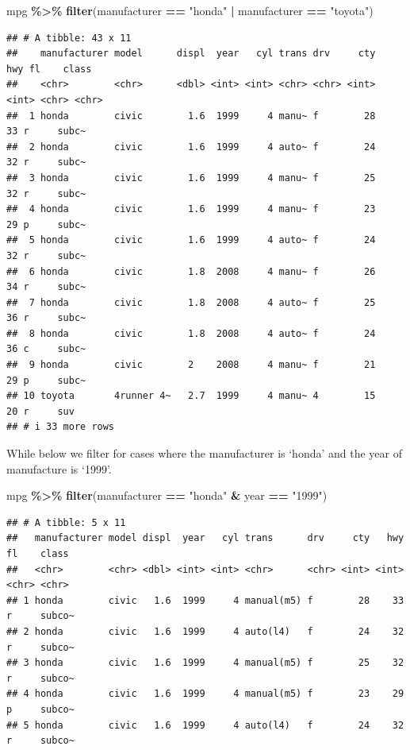 \documentclass[
]{book}
\newenvironment{Shaded}{\begin{snugshade}}{\end{snugshade}}
\newcommand{\FunctionTok}[1]{\textcolor[rgb]{0.13,0.29,0.53}{\textbf{#1}}}
\newcommand{\NormalTok}[1]{#1}
\newcommand{\SpecialCharTok}[1]{\textcolor[rgb]{0.81,0.36,0.00}{\textbf{#1}}}
\newcommand{\StringTok}[1]{\textcolor[rgb]{0.31,0.60,0.02}{#1}}
\begin{document}
\begin{Shaded}
\begin{Highlighting}[]
\NormalTok{mpg }\SpecialCharTok{\%\textgreater{}\%}
  \FunctionTok{filter}\NormalTok{(manufacturer }\SpecialCharTok{==} \StringTok{"honda"} \SpecialCharTok{|}\NormalTok{ manufacturer }\SpecialCharTok{==} \StringTok{"toyota"}\NormalTok{)}
\end{Highlighting}
\end{Shaded}

\begin{verbatim}
## # A tibble: 43 x 11
##    manufacturer model      displ  year   cyl trans drv     cty   hwy fl    class
##    <chr>        <chr>      <dbl> <int> <int> <chr> <chr> <int> <int> <chr> <chr>
##  1 honda        civic        1.6  1999     4 manu~ f        28    33 r     subc~
##  2 honda        civic        1.6  1999     4 auto~ f        24    32 r     subc~
##  3 honda        civic        1.6  1999     4 manu~ f        25    32 r     subc~
##  4 honda        civic        1.6  1999     4 manu~ f        23    29 p     subc~
##  5 honda        civic        1.6  1999     4 auto~ f        24    32 r     subc~
##  6 honda        civic        1.8  2008     4 manu~ f        26    34 r     subc~
##  7 honda        civic        1.8  2008     4 auto~ f        25    36 r     subc~
##  8 honda        civic        1.8  2008     4 auto~ f        24    36 c     subc~
##  9 honda        civic        2    2008     4 manu~ f        21    29 p     subc~
## 10 toyota       4runner 4~   2.7  1999     4 manu~ 4        15    20 r     suv  
## # i 33 more rows
\end{verbatim}

While below we filter for cases where the manufacturer is `honda' and the year of manufacture is `1999'.

\begin{Shaded}
\begin{Highlighting}[]
\NormalTok{mpg }\SpecialCharTok{\%\textgreater{}\%} 
  \FunctionTok{filter}\NormalTok{(manufacturer }\SpecialCharTok{==} \StringTok{"honda"} \SpecialCharTok{\&}\NormalTok{ year }\SpecialCharTok{==} \StringTok{"1999"}\NormalTok{)}
\end{Highlighting}
\end{Shaded}

\begin{verbatim}
## # A tibble: 5 x 11
##   manufacturer model displ  year   cyl trans      drv     cty   hwy fl    class 
##   <chr>        <chr> <dbl> <int> <int> <chr>      <chr> <int> <int> <chr> <chr> 
## 1 honda        civic   1.6  1999     4 manual(m5) f        28    33 r     subco~
## 2 honda        civic   1.6  1999     4 auto(l4)   f        24    32 r     subco~
## 3 honda        civic   1.6  1999     4 manual(m5) f        25    32 r     subco~
## 4 honda        civic   1.6  1999     4 manual(m5) f        23    29 p     subco~
## 5 honda        civic   1.6  1999     4 auto(l4)   f        24    32 r     subco~
\end{verbatim}
\end{document}
